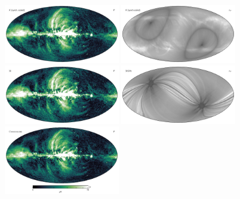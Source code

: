 \documentclass[twocolumn]{../../common/aa}
\begin{document}
%


\begin{figure}
	\centering
	\includegraphics[width=0.45\textwidth]{figures/Kband_polint.pdf}
	\includegraphics[width=0.45\textwidth]{figures/Kband_sigmaP.pdf}\\
	\includegraphics[width=0.45\textwidth]{figures/30GHz_polint.pdf}
	\includegraphics[width=0.45\textwidth]{figures/30GHz_sigmaP.pdf}\\
	\includegraphics[width=0.45\textwidth]{figures/polint_CG.pdf}

\end{figure}
\end{document}
